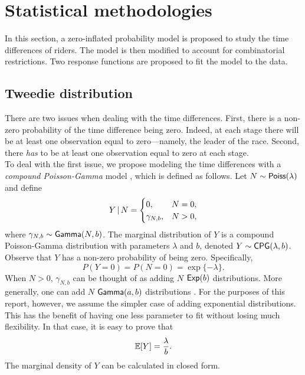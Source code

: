 \documentclass[aos,preprint]{imsart}
\begin{document}
\FloatBarrier


\section{Statistical methodologies} \label{sec:stats}

In this section, a zero-inflated probability model is proposed to study the time differences of riders. The model is then modified to account for combinatorial restrictions. Two response functions are proposed to fit the model to the data.



\subsection{Tweedie distribution}

There are two issues when dealing with the time differences. First, there is a non-zero probability of the time difference being zero. Indeed, at each stage there will be at least one observation equal to zero---namely, the leader of the race. Second, there \textit{has} to be at least one observation equal to zero at each stage. \\


To deal with the first issue, we propose modeling the time differences with a \textit{compound Poisson-Gamma} model \citep{tweedie1984, jorgensen1987}, which is defined as follows. Let $N \sim {\sf{Poiss}}(\lambda)$ and define
\[
  Y \given N = \begin{cases}
    0, & N = 0, \\
    \gamma_{N, b}, & N > 0,
  \end{cases}
\]
where $\gamma_{N, b} \sim {\sf{Gamma}}(N, b)$. The marginal distribution of $Y$ is a compound Poisson-Gamma distribution with parameters $\lambda$ and $b$, denoted $Y \sim {\sf{CPG}}(\lambda, b)$. Observe that $Y$ has a non-zero probability of being zero. Specifically,
\[
  P(Y = 0) = P(N = 0) = \exp \{ -\lambda \}.
\]
When $N > 0$, $\gamma_{N, b}$ can be thought of as adding $N$ \iid ${\sf{Exp}}(b)$ distributions. More generally, one can add $N$ \iid ${\sf{Gamma}}(a, b)$ distributions \citep[see][]{withers2011}. For the purposes of this report, however, we assume the simpler case of adding exponential distributions. This has the benefit of having one less parameter to fit without losing much flexibility. In that case, it is easy to prove that
\[
  \mathbb{E} [Y] = \frac{\lambda}{b}.
\]
The marginal density of $Y$ can be calculated in closed form.
\end{document}
